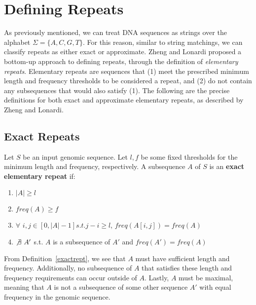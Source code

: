 \section{Defining Repeats}
As previously mentioned, we can treat DNA sequences as strings over the alphabet $\Sigma=\lbrace A, C, G, T \rbrace$. For this reason, similar to string matchings, we can classify repeats as either exact or approximate. Zheng and Lonardi \cite{zheng2005discovery} proposed a bottom-up approach to defining repeats, through the definition of \textit{elementary repeats}. Elementary repeats are sequences that (1) meet the prescribed minimum length and frequency thresholds to be considered a repeat, and (2) do not contain any subsequences that would also satisfy (1). The following are the precise definitions for both exact and approximate elementary repeats, as described by Zheng and Lonardi.

\subsection{Exact Repeats}
\begin{defn}
Let $S$ be an input genomic sequence. Let $l, f$ be some fixed thresholds for the minimum length and frequency, respectively.  A subsequence $A$ of $S$ is an \textbf{exact elementary repeat} if:
\begin{enumerate}
\item{$|A| \geq l$}
\item{$freq(A) \geq f$}
\item{$\forall$ $i, j \in [0,|A|-1] s.t. j-i \geq l$,  $freq(A[i,j]) = freq(A)$}
\item{$\not\exists\ A'$ s.t. $A$ is a subsequence of $A'$ and $freq(A') = freq(A)$}
\end{enumerate}
\label{exactrept}
\end{defn}

From Definition~\ref{exactrept}, we see that $A$ must have sufficient length and frequency. Additionally, no subsequence of $A$ that satisfies these length and frequency requirements can occur outside of $A$. Lastly, $A$ must be maximal, meaning that $A$ is not a subsequence of some other sequence $A'$ with equal frequency in the genomic sequence.

